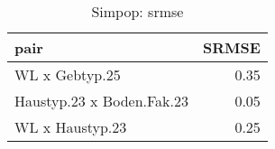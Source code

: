 \begin{table}[ht]
\centering
\begin{tabular}{lr}
  \hline
pair & SRMSE \\ 
  \hline
WL x Gebtyp.25 & 0.35 \\ 
  Haustyp.23 x Boden.Fak.23 & 0.05 \\ 
  WL x Haustyp.23 & 0.25 \\ 
   \hline
\end{tabular}
\caption{Simpop: srmse} 
\end{table}
